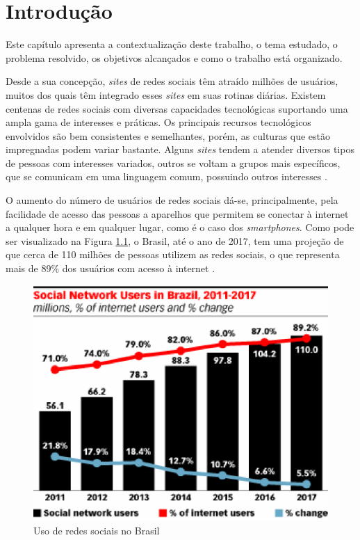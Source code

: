 \chapter{Introdução}

Este capítulo apresenta a contextualização deste trabalho, o tema estudado, o problema resolvido, os objetivos alcançados e como o trabalho está organizado.

Desde a sua concepção, \textit{sites} de redes sociais têm atraído milhões de usuários, muitos dos quais têm integrado esses \textit{sites} em suas rotinas diárias. Existem centenas de redes sociais com diversas capacidades tecnológicas suportando uma ampla gama de interesses e práticas. Os principais recursos tecnológicos envolvidos são bem consistentes e semelhantes, porém, as culturas que estão impregnadas podem variar bastante. Alguns \textit{sites} tendem a atender diversos tipos de pessoas com interesses variados, outros se voltam a grupos mais específicos, que se comunicam em uma linguagem comum, possuindo outros interesses \cite{Boyd:Ellison:2007}.

O aumento do número de usuários de redes sociais dá-se, principalmente, pela facilidade de acesso das pessoas a aparelhos que permitem se conectar à internet a qualquer hora e em qualquer lugar, como é o caso dos \textit{smartphones}. Como pode ser visualizado na Figura \ref{social_network_brazil}, o Brasil, até o ano de 2017, tem uma projeção de que cerca de 110 milhões de pessoas utilizem as redes sociais, o que representa mais de 89\% dos usuários com acesso à internet \cite{eMarketer:2013}.

\begin{figure}[!h]
	\centering
	\includegraphics[scale=0.8]{figuras/introducao/social_network_brazil.eps}
	\caption[Uso de redes sociais no Brasil]{Uso de redes sociais no Brasil \cite{eMarketer:2013}}
	\label{social_network_brazil}
\end{figure}

